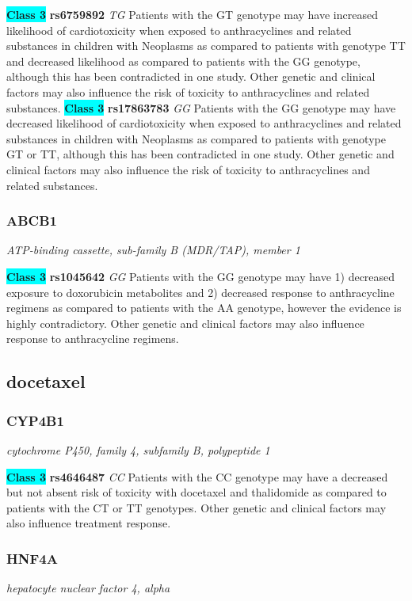 \documentclass{report}
\begin{document}
\textbf{\colorbox{cyan} {Class 3}} \textbf{ rs6759892 } \textit{ TG }
Patients with the GT genotype may have increased likelihood of cardiotoxicity when exposed to anthracyclines and related substances in children with Neoplasms as compared to patients with genotype TT and decreased likelihood as compared to patients with the GG genotype, although this has been contradicted in one study. Other genetic and clinical factors may also influence the risk of toxicity to anthracyclines and related substances. \newline\textbf{\colorbox{cyan} {Class 3}} \textbf{ rs17863783 } \textit{ GG }
Patients with the GG genotype may have decreased likelihood of cardiotoxicity when exposed to anthracyclines and related substances in children with Neoplasms as compared to patients with genotype GT or TT, although this has been contradicted in one study. Other genetic and clinical factors may also influence the risk of toxicity to anthracyclines and related substances.
\newline\subsubsection{ ABCB1 }
\textit{ ATP-binding cassette, sub-family B (MDR/TAP), member 1 }

\textbf{\colorbox{cyan} {Class 3}} \textbf{ rs1045642 } \textit{ GG }
Patients with the GG genotype may have 1) decreased exposure to doxorubicin metabolites and 2) decreased response to anthracycline regimens as compared to patients with the AA genotype, however the evidence is highly contradictory. Other genetic and clinical factors may also influence response to anthracycline regimens.\newline\subsection{ docetaxel }\subsubsection{ CYP4B1 }
\textit{ cytochrome P450, family 4, subfamily B, polypeptide 1 }

\textbf{\colorbox{cyan} {Class 3}} \textbf{ rs4646487 } \textit{ CC }
Patients with the CC genotype may have a decreased but not absent risk of toxicity with docetaxel and thalidomide as compared to patients with the CT or TT genotypes. Other genetic and clinical factors may also influence treatment response.\newline\subsubsection{ HNF4A }
\textit{ hepatocyte nuclear factor 4, alpha }
\end{document}
